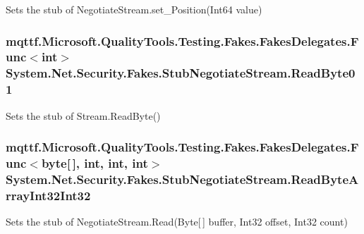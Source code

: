 Sets the stub of Negotiate\-Stream.\-set\-\_\-\-Position(\-Int64 value)

\hypertarget{class_system_1_1_net_1_1_security_1_1_fakes_1_1_stub_negotiate_stream_a5048cdb36f65029dd336dd813b4df695}{
\subsubsection[{Read\-Byte01}]{\setlength{\rightskip}{0pt plus 5cm}mqttf.\-Microsoft.\-Quality\-Tools.\-Testing.\-Fakes.\-Fakes\-Delegates.\-Func$<$int$>$ System.\-Net.\-Security.\-Fakes.\-Stub\-Negotiate\-Stream.\-Read\-Byte01}}\label{class_system_1_1_net_1_1_security_1_1_fakes_1_1_stub_negotiate_stream_a5048cdb36f65029dd336dd813b4df695}


Sets the stub of Stream.\-Read\-Byte()

\hypertarget{class_system_1_1_net_1_1_security_1_1_fakes_1_1_stub_negotiate_stream_ac7da4bb473ab1c57bb0156e8e089abc3}{
\subsubsection[{Read\-Byte\-Array\-Int32\-Int32}]{\setlength{\rightskip}{0pt plus 5cm}mqttf.\-Microsoft.\-Quality\-Tools.\-Testing.\-Fakes.\-Fakes\-Delegates.\-Func$<$byte\mbox{[}$\,$\mbox{]}, int, int, int$>$ System.\-Net.\-Security.\-Fakes.\-Stub\-Negotiate\-Stream.\-Read\-Byte\-Array\-Int32\-Int32}}\label{class_system_1_1_net_1_1_security_1_1_fakes_1_1_stub_negotiate_stream_ac7da4bb473ab1c57bb0156e8e089abc3}


Sets the stub of Negotiate\-Stream.\-Read(\-Byte\mbox{[}$\,$\mbox{]} buffer, Int32 offset, Int32 count)


